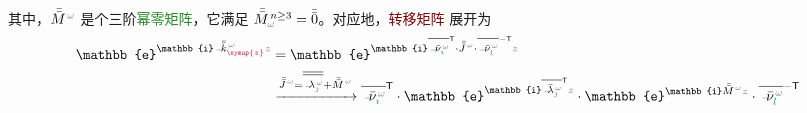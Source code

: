 其中，$\bar{\bar{M}}^{\;\!\mathcolor{gray}{\omega}}$ 是个三阶\textcolor{ForestGreen}{幂零矩阵}，它满足 $\bar{\bar{M}}_{\mathcolor{gray}{\omega}}^{\;\! n \geq 3} = \bar{\bar{0}}$。对应地，\textcolor{Maroon}{转移矩阵} 展开为
\begin{subequations}
\begin{align}
	\mathbb{e}^{\mathbb{i} \Xint{\begin{smallmatrix} ~ \\ {}^{}_{\mathcolor{gray}{-}} \\ ~ \end{smallmatrix}}{15}{\bar{\bar{k}}}_{\textcolor{Maroon}{\symup{z}}}^{\;\! \mathcolor{gray}{\omega}} \mathcolor{gray}{z}} &= \mathbb{e}^{\mathbb{i} \overline{\Xint{\begin{smallmatrix} ~ \\ {}^{}_{\mathcolor{gray}{-}} \\ ~ \end{smallmatrix}}{15}{\bar{\nu}}^{\;\!\mathcolor{gray}{\omega}}_{\textcolor{ForestGreen}{\imath}}}^\mathsf{T} \cdot \bar{\bar{J}}^{\;\!\mathcolor{gray}{\omega}} \cdot \overline{\Xint{\begin{smallmatrix} ~ \\ {}^{}_{\mathcolor{gray}{-}} \\ ~ \end{smallmatrix}}{15}{\bar{\nu}}^{\;\!\mathcolor{gray}{\omega}}_{\textcolor{ForestGreen}{l}}}^{-\mathsf{T}} \mathcolor{gray}{z}} \label{eq:e^ikzz-Jordan_decompose} \\ &\xrightarrow[]{\bar{\bar{J}}^{\;\!\mathcolor{gray}{\omega}} = \overline{\overline{\Xint{\begin{smallmatrix} ~ \\ {}^{}_{\mathcolor{gray}{-}} \\ ~ \end{smallmatrix}}{22}{\lambda}^{\;\!\mathcolor{gray}{\omega}}_{\textcolor{ForestGreen}{\jmath}}}} + \bar{\bar{M}}^{\;\!\mathcolor{gray}{\omega}}} \overline{\Xint{\begin{smallmatrix} ~ \\ {}^{}_{\mathcolor{gray}{-}} \\ ~ \end{smallmatrix}}{15}{\bar{\nu}}^{\;\!\mathcolor{gray}{\omega}}_{\textcolor{ForestGreen}{\imath}}}^{\mathsf{T}} \cdot \mathbb{e}^{\mathbb{i} \overline{\Xint{\begin{smallmatrix} ~ \\ {}^{}_{\mathcolor{gray}{-}} \\ ~ \end{smallmatrix}}{22}{\bar{\lambda}}^{\;\!\mathcolor{gray}{\omega}}_{\textcolor{ForestGreen}{\jmath}}}^{\mathsf{T}} \mathcolor{gray}{z}} \cdot \mathbb{e}^{\mathbb{i} \bar{\bar{M}}^{\;\!\mathcolor{gray}{\omega}} \mathcolor{gray}{z}} \cdot \overline{\Xint{\begin{smallmatrix} ~ \\ {}^{}_{\mathcolor{gray}{-}} \\ ~ \end{smallmatrix}}{15}{\bar{\nu}}^{\;\!\mathcolor{gray}{\omega}}_{\textcolor{ForestGreen}{l}}}^{-{\mathsf{T}}} \label{eq:e^ikzz-Jordan_decompose2} \\ 

\end{align}
\end{subequations}
